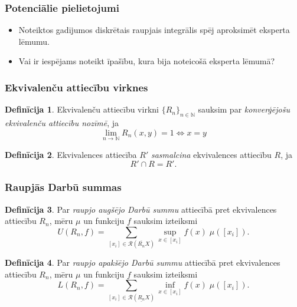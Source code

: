\documentclass{beamer}
\theoremstyle{definition}
\newtheorem{definicija}{Definīcija}
\begin{document}
\begin{frame}
\frametitle{Potenciālie pielietojumi}

\begin{itemize}
\setlength\itemsep{3em}
\item Noteiktos gadījumos diskrētais raupjais integrālis spēj aproksimēt eksperta lēmumu.
\item Vai ir iespējams noteikt īpašību, kura bija noteicošā eksperta lēmumā?
\end{itemize}
\end{frame}

\begin{frame}
\frametitle{Ekvivalenču attiecību virknes}
\begin{definicija}
  Ekvivalenču attiecību virkni $\{R_n\}_{n\in\mathbb{N}}$ sauksim par
  \emph{konverģējošu ekvivalenču attiecību nozīmē}, ja
  $$
\lim\limits_{n\rightarrow \mathbb{N}} R_n(x,y) = 1 \iff x = y 
  $$

\end{definicija}

\begin{definicija}
  Ekvivalences attiecība $R'$ \emph{sasmalcina} ekvivalences attiecību $R$, ja 
  $$
  R' \cap R = R'.
  $$
\end{definicija}
\end{frame}

\begin{frame}
\frametitle{Raupjās Darbū summas}
\begin{definicija}
  Par \emph{raupjo augšējo Darbū summu} attiecībā pret ekvivalences attiecību
  $R_n$, mēru $\mu$ un funkciju $f$ sauksim izteiksmi
  $$
  U(R_n,f) = \sum\limits_{[x_i]\in\mathscr{R}(\overline{R_n}X)} \sup\limits_{x \in
    [x_i]} f(x) \; \mu{([x_i])}.
  $$

\end{definicija}

\begin{definicija}
Par \emph{raupjo apakšējo Darbū summu} attiecībā pret ekvivalences attiecību
  $R_n$, mēru $\mu$ un funkciju $f$ sauksim izteiksmi
  $$
  L(R_n,f) = \sum\limits_{[x_i]\in\mathscr{R}(\underline{R_n}X)} \inf\limits_{x \in
    [x_i]} f(x) \; \mu{([x_i])}.
  $$
\end{definicija}

\end{frame}
\end{document}
